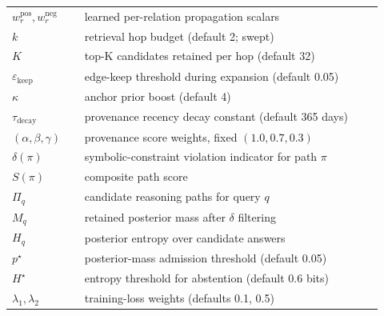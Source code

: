 \begin{table}[t]
\begin{tabular}{@{}p{0.18\linewidth}p{0.74\linewidth}@{}}
$w_r^{\text{pos}}, w_r^{\text{neg}}$ & learned per-relation propagation scalars \\
$k$                 & retrieval hop budget (default 2; swept) \\
$K$                 & top-K candidates retained per hop (default 32) \\
$\varepsilon_{\text{keep}}$ & edge-keep threshold during expansion (default 0.05) \\
$\kappa$            & anchor prior boost (default 4) \\
$\tau_{\text{decay}}$ & provenance recency decay constant (default 365 days) \\
$(\alpha,\beta,\gamma)$ & provenance score weights, fixed $(1.0, 0.7, 0.3)$ \\
$\delta(\pi)$       & symbolic-constraint violation indicator for path $\pi$ \\
$S(\pi)$            & composite path score \\
$\Pi_q$             & candidate reasoning paths for query $q$ \\
$M_q$               & retained posterior mass after $\delta$ filtering \\
$H_q$               & posterior entropy over candidate answers \\
$p^\star$           & posterior-mass admission threshold (default 0.05) \\
$H^\star$           & entropy threshold for abstention (default 0.6 bits) \\
$\lambda_1, \lambda_2$ & training-loss weights (defaults 0.1, 0.5) \\
\bottomrule
\end{tabular}
\end{table}
